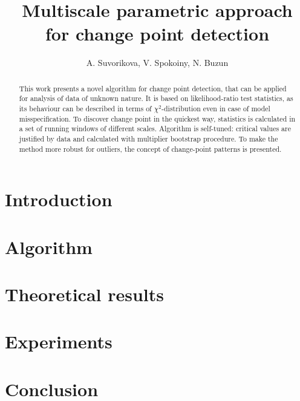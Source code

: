 \documentclass{article} %
\title{Multiscale parametric approach \\ for change point detection}
\author{A. Suvorikova, V. Spokoiny, N. Buzun}
\begin{document}
\maketitle

\begin{abstract}
This work presents a novel algorithm for change point detection, that can be applied for analysis of data of unknown nature. It is based on likelihood-ratio test statistics, as its behaviour can be described in terms of $\chi^2$-distribution even in case of model misspecification. To discover change point in the quickest way, statistics is calculated in a set of running windows of different scales. Algorithm is self-tuned: critical values are justified by data and calculated with multiplier bootstrap procedure. To make the method more robust for outliers, the concept of change-point patterns is presented.   
\end{abstract}





\section{Introduction}


%


\section{Algorithm}

%



\section{Theoretical results}
 


\section{Experiments}



\section{Conclusion}




{}

\end{document}
